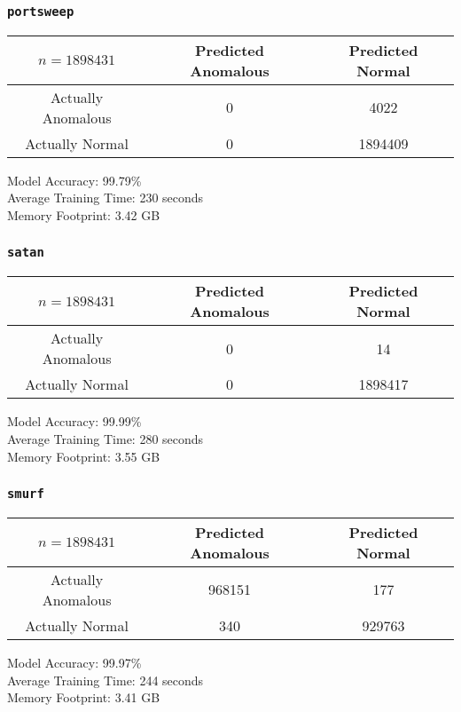 \documentclass[letterpaper,12pt]{article}
\begin{document}
\subsubsection*{\texttt{portsweep}}
\begin{center}
  \begin{tabular}{c|c|c}
    \( n  = 1898431 \) & Predicted Anomalous & Predicted Normal \\
    \hline
    Actually Anomalous & 0 & 4022 \\
    \hline
    Actually Normal & 0 & 1894409
  \end{tabular}
\end{center}
Model Accuracy: 99.79\% \\
Average Training Time: 230 seconds \\
Memory Footprint: 3.42 GB

\subsubsection*{\texttt{satan}}
\begin{center}
  \begin{tabular}{c|c|c}
    \( n  = 1898431 \) & Predicted Anomalous & Predicted Normal \\
    \hline
    Actually Anomalous & 0 & 14 \\
    \hline
    Actually Normal & 0 & 1898417
  \end{tabular}
\end{center}
Model Accuracy: 99.99\% \\
Average Training Time: 280 seconds \\
Memory Footprint: 3.55 GB

\subsubsection*{\texttt{smurf}}
\begin{center}
  \begin{tabular}{c|c|c}
    \( n  = 1898431 \) & Predicted Anomalous & Predicted Normal \\
    \hline
    Actually Anomalous & 968151 & 177 \\
    \hline
    Actually Normal & 340 & 929763
  \end{tabular}
\end{center}
Model Accuracy: 99.97\% \\
Average Training Time: 244 seconds \\
Memory Footprint: 3.41 GB
\end{document}
